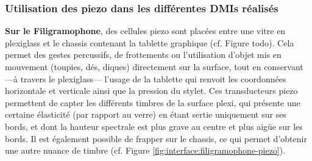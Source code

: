 \subsubsection{Utilisation des piezo dans les différentes DMIs réalisés}
\indent \textbf{Sur le Filigramophone}, des cellules piezo sont placées entre une vitre en plexiglass et le chassis contenant la tablette graphique (cf. Figure todo). Cela permet des gestes percussifs, de frottements ou l'utilisation d'objet mis en mouvement (toupies, dés, diques) directement sur la surface, tout en conservant —à travers le plexiglass— l'usage de la tablette qui renvoit les coordonnées horizontale et verticale ainsi que la pression du stylet. Ces transducteurs piezo permettent de capter les différents timbres de la surface plexi, qui présente une certaine élasticité (par rapport au verre) en étant sertie uniquement sur ses bords, et dont la hauteur spectrale est plus grave au centre et plus aigüe sur les bords. Il est également possible de frapper sur le chassis, ce qui permet d'obtenir une autre nuance de timbre (cf. Figure \ref{fig:interface:filigramophone-piezo}).\\
